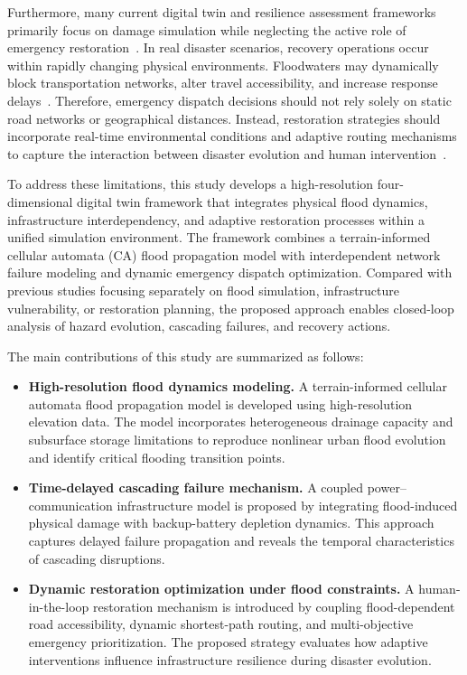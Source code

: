 \documentclass[preprint,12pt]{elsarticle}
\begin{document}
Furthermore, many current digital twin and resilience assessment frameworks
primarily focus on damage simulation while neglecting the active role of
emergency restoration~\cite{batty2018digital,grieves2017digital,
tao2019digital}. In real disaster scenarios, recovery operations occur within
rapidly changing physical environments. Floodwaters may dynamically block
transportation networks, alter travel accessibility, and increase response
delays~\cite{laporte2009fifty}. Therefore, emergency dispatch decisions
should not rely solely on static road networks or geographical distances.
Instead, restoration strategies should incorporate real-time environmental
conditions and adaptive routing mechanisms to capture the interaction between
disaster evolution and human intervention~\cite{dibaldassarre2013socio}.

To address these limitations, this study develops a high-resolution
four-dimensional digital twin framework that integrates physical flood
dynamics, infrastructure interdependency, and adaptive restoration processes
within a unified simulation environment. The framework combines a
terrain-informed cellular automata (CA) flood propagation model with
interdependent network failure modeling and dynamic emergency dispatch
optimization. Compared with previous studies focusing separately on flood
simulation, infrastructure vulnerability, or restoration planning, the
proposed approach enables closed-loop analysis of hazard evolution, cascading
failures, and recovery actions.

The main contributions of this study are summarized as follows:
\begin{itemize}
\item \textbf{High-resolution flood dynamics modeling.} A terrain-informed
cellular automata flood propagation model is developed using high-resolution
elevation data. The model incorporates heterogeneous drainage capacity and
subsurface storage limitations to reproduce nonlinear urban flood evolution
and identify critical flooding transition points.
\item \textbf{Time-delayed cascading failure mechanism.} A coupled
power--communication infrastructure model is proposed by integrating
flood-induced physical damage with backup-battery depletion dynamics. This
approach captures delayed failure propagation and reveals the temporal
characteristics of cascading disruptions.
\item \textbf{Dynamic restoration optimization under flood constraints.} A
human-in-the-loop restoration mechanism is introduced by coupling
flood-dependent road accessibility, dynamic shortest-path routing, and
multi-objective emergency prioritization. The proposed strategy evaluates how
adaptive interventions influence infrastructure resilience during disaster
evolution.
\end{itemize}
\end{document}
